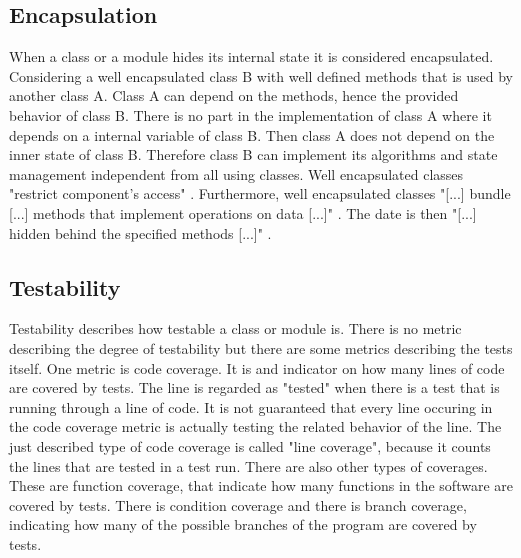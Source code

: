 \subsection*{Encapsulation}
\label{encapsulation}
When a class or a module hides its internal state it is considered encapsulated. Considering a well encapsulated class B with well defined methods that is used by another class A.  Class A can depend on the methods, hence the provided behavior of class B.
There is no part in the implementation of class A where it depends on a internal variable of class B. Then class A does not depend on the inner state of class B. Therefore class B can implement its algorithms and state management independent from all using classes. 
Well encapsulated classes "restrict component's access" \cite[Encapsulation]{wiki}. Furthermore, well encapsulated classes "[...] bundle [...] methods that implement operations on data [...]" \cite[Encapuslation]{wiki}. The date is then "[...] hidden behind the specified methods [...]" \cite[Encapsulation]{wiki}.

\subsection*{Testability}
\label{testability}
Testability describes how testable a class or module is. There is no metric describing the degree of testability but there are some metrics describing the tests itself. 
One metric is code coverage. It is and indicator on how many lines of code are covered by tests. The line is regarded as "tested" when there is a test that is running through a line of code. It is not guaranteed that every line occuring in the code coverage metric is actually testing the related behavior of the line. 
The just described type of code coverage is called "line coverage", because it counts the lines that are tested in a test run. There are also other types of coverages. These are function coverage, that indicate how many functions in the software are covered by tests. There is condition coverage and there is branch coverage, indicating how many of the possible branches of the program are covered by tests. 

